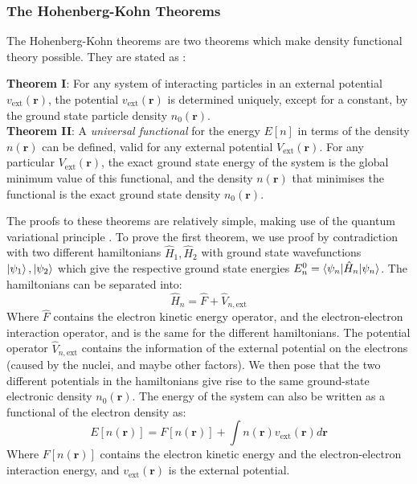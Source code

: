 \documentclass[12pt]{article}
\begin{document}
\subsubsection{The Hohenberg-Kohn Theorems}
The Hohenberg-Kohn theorems are two theorems which make density functional theory possible. They are stated as \cite{martin_2004}:
\begin{displayquote}
	\textbf{Theorem I}: For any system of interacting particles in an external potential $v_\mathrm{ext}(\mathbf r)$, the potential $v_\mathrm{ext}(\mathbf r)$ is determined uniquely, except for a constant, by the ground state particle density $n_0(\mathbf{r})$.
\\
	\textbf{Theorem II}: A \textit{universal functional} for the energy $E[n]$ in terms of the density $n(\mathbf r)$ can be defined, valid for any external potential $V_\mathrm{ext}(\mathbf r)$.
For any particular $V_\mathrm{ext}(\mathbf r)$, the exact ground state energy of the system is the global minimum value of this functional, and the density $n(\mathbf r)$ that minimises the functional is the exact ground state density $n_0(\mathbf r)$.
\end{displayquote}
The proofs to these theorems are relatively simple, making use of the quantum variational principle \cite{shankar2012principles}.
To prove the first theorem, we use proof by contradiction with two different hamiltonians $\hat H_1, \hat H_2$ with ground state wavefunctions $\ket{\psi_1}, \ket{\psi_2}$ which give the respective ground state energies $E^0_n=\braket{\psi_n | \hat H_n | \psi_n}$. 
The hamiltonians can be separated into:
\begin{equation}
\hat H_n = \hat F + \hat V_{n, \mathrm{ext}}
\end{equation}
Where $\hat F$ contains the electron kinetic energy operator, and the electron-electron interaction operator, and is the same for the different hamiltonians. The potential operator $\hat V_{n, \mathrm{ext}}$ contains the information of the external potential on the electrons (caused by the nuclei, and maybe other factors).
We then pose that the two different potentials in the hamiltonians give rise to the same ground-state electronic density $n_0(\mathbf r)$.
The energy of the system can also be written as a functional of the electron density as:
\begin{equation}\label{eq:energy_functional}
E[n(\mathbf r)] = F[n(\mathbf r)]+ \int n(\mathbf r)v_{\mathrm{ext}}(\mathbf r)d\mathbf r
\end{equation}
Where $F[n(\mathbf r)]$ contains the electron kinetic energy and the electron-electron interaction energy, and $v_{\mathrm{ext}}(\mathbf r)$ is the external potential.
\end{document}
